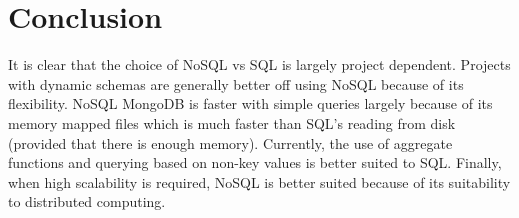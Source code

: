\documentclass[hidelinks,english]{article}
\begin{document}
    \section{Conclusion}
    It is clear that the choice of NoSQL vs SQL is largely project dependent.
    Projects with dynamic schemas are generally better off using NoSQL because of its flexibility.
    NoSQL MongoDB is faster with simple queries largely because of its memory mapped files \cite{parker2013comparing} which is much faster than SQL's reading from disk (provided that there is enough memory).
    Currently, the use of aggregate functions and querying based on non-key values is better suited to SQL.
    Finally, when high scalability is required, NoSQL is better suited because of its suitability to distributed computing.

	
	
	
\end{document}
